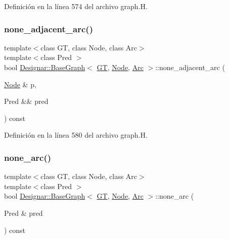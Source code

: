 Definición en la línea 574 del archivo graph.\+H.

\mbox{\label{class_designar_1_1_base_graph_adbacdf829cb2f21aff498bac9c9a8b8b}} 
\subsubsection{\texorpdfstring{none\+\_\+adjacent\+\_\+arc()}{none\_adjacent\_arc()}\hspace{0.1cm}{\footnotesize\ttfamily [2/2]}}
{\footnotesize\ttfamily template$<$class GT, class Node, class Arc$>$ \\
template$<$class Pred $>$ \\
bool \hyperlink{class_designar_1_1_base_graph}{Designar\+::\+Base\+Graph}$<$ \hyperlink{demo-buildgraph_8_c_a3001c40d2c31ca87ed96cd7d1334a55e}{GT}, \hyperlink{namespace_designar_a5af326c65aa2bd26b26c410f2030d09e}{Node}, \hyperlink{namespace_designar_a3f55fb5513d62ff47cbc8f72b8e95d6f}{Arc} $>$\+::none\+\_\+adjacent\+\_\+arc (\begin{DoxyParamCaption}\item[{\hyperlink{namespace_designar_a5af326c65aa2bd26b26c410f2030d09e}{Node} \&}]{p,  }\item[{Pred \&\&}]{pred }\end{DoxyParamCaption}) const\hspace{0.3cm}{\ttfamily [inline]}}



Definición en la línea 580 del archivo graph.\+H.

\mbox{\label{class_designar_1_1_base_graph_a023f28dd8824ba7a0c26342effd0fddf}} 
\subsubsection{\texorpdfstring{none\+\_\+arc()}{none\_arc()}\hspace{0.1cm}{\footnotesize\ttfamily [1/2]}}
{\footnotesize\ttfamily template$<$class GT, class Node, class Arc$>$ \\
template$<$class Pred $>$ \\
bool \hyperlink{class_designar_1_1_base_graph}{Designar\+::\+Base\+Graph}$<$ \hyperlink{demo-buildgraph_8_c_a3001c40d2c31ca87ed96cd7d1334a55e}{GT}, \hyperlink{namespace_designar_a5af326c65aa2bd26b26c410f2030d09e}{Node}, \hyperlink{namespace_designar_a3f55fb5513d62ff47cbc8f72b8e95d6f}{Arc} $>$\+::none\+\_\+arc (\begin{DoxyParamCaption}\item[{Pred \&}]{pred }\end{DoxyParamCaption}) const\hspace{0.3cm}{\ttfamily [inline]}}



